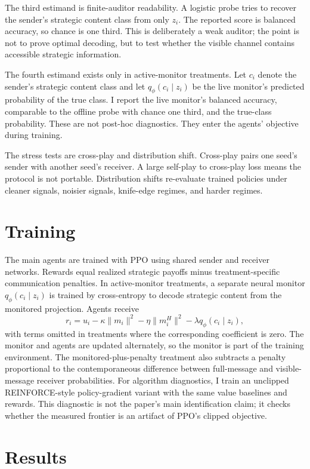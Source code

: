 \documentclass[11pt]{article}
\begin{document}
The third estimand is finite-auditor readability. A logistic probe tries to recover the sender's strategic content class from only $z_i$. The reported score is balanced accuracy, so chance is one third. This is deliberately a weak auditor; the point is not to prove optimal decoding, but to test whether the visible channel contains accessible strategic information.

The fourth estimand exists only in active-monitor treatments. Let $c_i$ denote the sender's strategic content class and let $q_\phi(c_i \mid z_i)$ be the live monitor's predicted probability of the true class. I report the live monitor's balanced accuracy, comparable to the offline probe with chance one third, and the true-class probability. These are not post-hoc diagnostics. They enter the agents' objective during training.

The stress tests are cross-play and distribution shift. Cross-play pairs one seed's sender with another seed's receiver. A large self-play to cross-play loss means the protocol is not portable. Distribution shifts re-evaluate trained policies under cleaner signals, noisier signals, knife-edge regimes, and harder regimes.

\section{Training}

The main agents are trained with PPO using shared sender and receiver networks. Rewards equal realized strategic payoffs minus treatment-specific communication penalties. In active-monitor treatments, a separate neural monitor $q_\phi(c_i \mid z_i)$ is trained by cross-entropy to decode strategic content from the monitored projection. Agents receive
\[
    r_i = u_i - \kappa \lVert m_i\rVert^2 - \eta \lVert m_i^H\rVert^2 - \lambda q_\phi(c_i \mid z_i),
\]
with terms omitted in treatments where the corresponding coefficient is zero. The monitor and agents are updated alternately, so the monitor is part of the training environment. The monitored-plus-penalty treatment also subtracts a penalty proportional to the contemporaneous difference between full-message and visible-message receiver probabilities. For algorithm diagnostics, I train an unclipped REINFORCE-style policy-gradient variant with the same value baselines and rewards. This diagnostic is not the paper's main identification claim; it checks whether the measured frontier is an artifact of PPO's clipped objective.

\section{Results}
\end{document}

